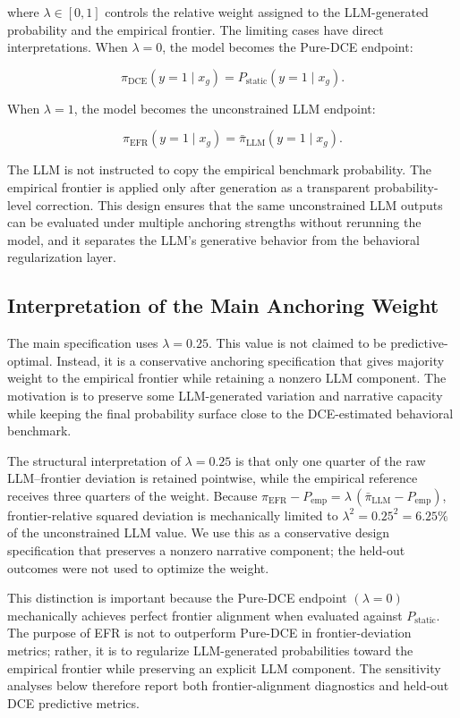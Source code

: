 \documentclass[11pt]{article}
\begin{document}
where \(\lambda \in [0,1]\) controls the relative weight assigned to the LLM-generated probability and the empirical frontier. The limiting cases have direct interpretations. When \(\lambda=0\), the model becomes the Pure-DCE endpoint:

\[
\pi_{\mathrm{DCE}}(y=1 \mid x_g)
=
P_{\mathrm{static}}(y=1 \mid x_g).
\]

When \(\lambda=1\), the model becomes the unconstrained LLM endpoint:

\[
\pi_{\mathrm{EFR}}(y=1 \mid x_g)
=
\bar{\pi}_{\mathrm{LLM}}(y=1 \mid x_g).
\]

The LLM is not instructed to copy the empirical benchmark probability. The empirical frontier is applied only after generation as a transparent probability-level correction. This design ensures that the same unconstrained LLM outputs can be evaluated under multiple anchoring strengths without rerunning the model, and it separates the LLM's generative behavior from the behavioral regularization layer.

\subsection{Interpretation of the Main Anchoring Weight}

The main specification uses \(\lambda=0.25\). This value is not claimed to be predictive-optimal. Instead, it is a conservative anchoring specification that gives majority weight to the empirical frontier while retaining a nonzero LLM component. The motivation is to preserve some LLM-generated variation and narrative capacity while keeping the final probability surface close to the DCE-estimated behavioral benchmark.

The structural interpretation of \(\lambda=0.25\) is that only one quarter of the raw LLM--frontier deviation is retained pointwise, while the empirical reference receives three quarters of the weight. Because \(\pi_{\mathrm{EFR}} - P_{\mathrm{emp}} = \lambda\,(\bar\pi_{\mathrm{LLM}} - P_{\mathrm{emp}})\), frontier-relative squared deviation is mechanically limited to \(\lambda^2 = 0.25^2 = 6.25\%\) of the unconstrained LLM value. We use this as a conservative design specification that preserves a nonzero narrative component; the held-out outcomes were not used to optimize the weight.

This distinction is important because the Pure-DCE endpoint \((\lambda=0)\) mechanically achieves perfect frontier alignment when evaluated against \(P_{\mathrm{static}}\). The purpose of EFR is not to outperform Pure-DCE in frontier-deviation metrics; rather, it is to regularize LLM-generated probabilities toward the empirical frontier while preserving an explicit LLM component. The sensitivity analyses below therefore report both frontier-alignment diagnostics and held-out DCE predictive metrics.
\end{document}
